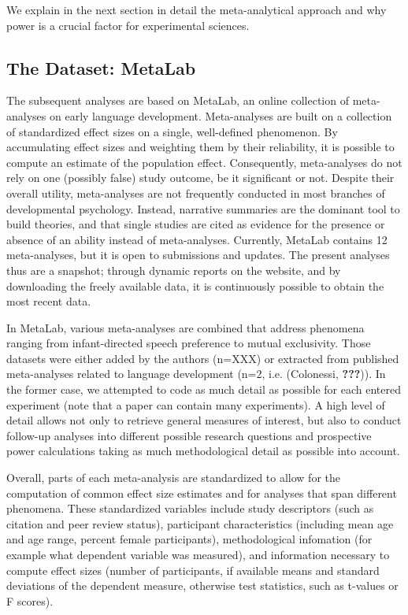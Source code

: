 \documentclass[english,floatsintext,man]{apa6}
\newcounter{author}
\begin{document}
We explain in the next section in detail the meta-analytical approach
and why power is a crucial factor for experimental sciences.

\subsection{The Dataset: MetaLab}\label{the-dataset-metalab}

The subsequent analyses are based on MetaLab, an online collection of
meta-analyses on early language development. Meta-analyses are built on
a collection of standardized effect sizes on a single, well-defined
phenomenon. By accumulating effect sizes and weighting them by their
reliability, it is possible to compute an estimate of the population
effect. Consequently, meta-analyses do not rely on one (possibly false)
study outcome, be it significant or not. Despite their overall utility,
meta-analyses are not frequently conducted in most branches of
developmental psychology. Instead, narrative summaries are the dominant
tool to build theories, and that single studies are cited as evidence
for the presence or absence of an ability instead of meta-analyses.
Currently, MetaLab contains 12 meta-analyses, but it is open to
submissions and updates. The present analyses thus are a snapshot;
through dynamic reports on the website, and by downloading the freely
available data, it is continuously possible to obtain the most recent
data.

In MetaLab, various meta-analyses are combined that address phenomena
ranging from infant-directed speech preference to mutual exclusivity.
Those datasets were either added by the authors (n=XXX) or extracted
from published meta-analyses related to language development (n=2, i.e.
(Colonessi, {\textbf{???}})). In the former case, we attempted to code
as much detail as possible for each entered experiment (note that a
paper can contain many experiments). A high level of detail allows not
only to retrieve general measures of interest, but also to conduct
follow-up analyses into different possible research questions and
prospective power calculations taking as much methodological detail as
possible into account.

Overall, parts of each meta-analysis are standardized to allow for the
computation of common effect size estimates and for analyses that span
different phenomena. These standardized variables include study
descriptors (such as citation and peer review status), participant
characteristics (including mean age and age range, percent female
participants), methodological infomation (for example what dependent
variable was measured), and information necessary to compute effect
sizes (number of participants, if available means and standard
deviations of the dependent measure, otherwise test statistics, such as
t-values or F scores).
\end{document}
